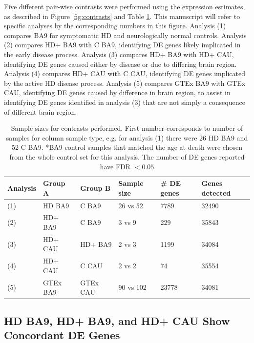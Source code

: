 \documentclass[fleqn,10pt,table]{wlscirep}
\begin{document}
Five different pair-wise contrasts were performed using the expression estimates, as described in Figure \ref{fig:contrasts} and Table \ref{tab:contrasts}.
This manuscript will refer to specific analyses by the corresponding numbers in this figure.
Analysis (1) compares BA9 for symptomatic HD and neurologically normal controls.
Analysis (2) compares HD+ BA9 with C BA9, identifying DE genes likely implicated in the early disease process.
Analysis (3) compares HD+ BA9 with HD+ CAU, identifying DE genes caused either by disease or due to differing brain region.
Analysis (4) compares HD+ CAU with C CAU, identifying DE genes implicated by the active HD disease process.
Analysis (5) compares GTEx BA9 with GTEx CAU, identifying DE genes caused by difference in brain region, to assist in identifying DE genes identified in analysis (3) that are not simply a consequence of different brain region.

\begin{table}[ht]
\centering
{}
\begin{tabular}{|l|l|l|l|l|l|} \hline
Analysis & Group A & Group B & Sample size & \# DE genes & Genes detected \\ \hline
(1) & HD BA9 & C BA9 & 26 vs 52 & 7789 & 32490 \\ \hline
(2) & HD+ BA9 & C BA9 & 3 vs 9 & 229 & 35843 \\ \hline
(3) & HD+ CAU & HD+ BA9 & 2 vs 3 & 1199 & 34084 \\ \hline
(4) & HD+ CAU & C CAU & 2 vs 2 & 74 & 35554 \\ \hline
(5) & GTEx BA9 & GTEx CAU & 90 vs 102 & 23778 & 34081 \\ \hline
\end{tabular}
\caption{Sample sizes for contrasts performed. First number corresponds to number of samples for column sample type, e.g. for analysis (1) there were 26 HD BA9 and 52 C BA9. *BA9 control samples that matched the age at death were chosen from the whole control set for this analysis. The number of DE genes reported have FDR $< 0.05$\label{tab:contrasts}}
\end{table}

\subsection{HD BA9, HD+ BA9, and HD+ CAU Show Concordant DE Genes}
\end{document}
